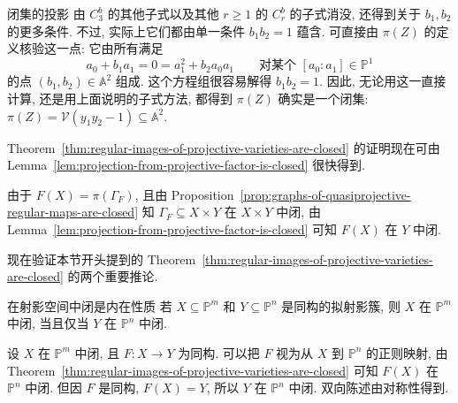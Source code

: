 \begin{Example}{闭集的投影}
由 $C_{3}^{b}$ 的其他子式以及其他 $r\ge1$ 的 $C_{r}^{b}$ 的子式消没, 还得到关于 $b_{1},b_{2}$ 的更多条件. 不过, 实际上它们都由单一条件 $b_{1}b_{2}=1$ 蕴含. 可直接由 $\pi(Z)$ 的定义核验这一点: 它由所有满足
\[
  a_{0}+b_{1}a_{1}=0=a_{1}^{2}+b_{2}a_{0}a_{1}
  \qquad\text{对某个 }[a_{0}:a_{1}]\in\mathbb{P}^{1}
\]
的点 $(b_{1},b_{2})\in\mathbb{A}^{2}$ 组成. 这个方程组很容易解得 $b_{1}b_{2}=1$. 因此, 无论用这一直接计算, 还是用上面说明的子式方法, 都得到 $\pi(Z)$ 确实是一个闭集: $\pi(Z)=\mathcal{V}(y_{1}y_{2}-1)\subseteq\mathbb{A}^{2}$.
\end{Example}

Theorem~\ref{thm:regular-images-of-projective-varieties-are-closed} 的证明现在可由 Lemma~\ref{lem:projection-from-projective-factor-is-closed} 很快得到.
\begingroup
\renewcommand{\AJProofBegin}{%
  \par\addvspace{\topsep}\noindent
  {\sffamily\bfseries\CJKfamily{pffont}Proof of Theorem~\ref{thm:regular-images-of-projective-varieties-are-closed}}\enspace\ignorespaces
}
\begin{Proof}
由于 $F(X)=\pi(\Gamma_{F})$, 且由 Proposition~\ref{prop:graphs-of-quasiprojective-regular-maps-are-closed} 知 $\Gamma_{F}\subseteq X\times Y$ 在 $X\times Y$ 中闭, 由 Lemma~\ref{lem:projection-from-projective-factor-is-closed} 可知 $F(X)$ 在 $Y$ 中闭.
\end{Proof}
\endgroup

现在验证本节开头提到的 Theorem~\ref{thm:regular-images-of-projective-varieties-are-closed} 的两个重要推论.

\begin{Corollary}{在射影空间中闭是内在性质}\leavevmode\label{cor:projectivity-invariant-under-quasiprojective-isomorphism}
若 $X\subseteq\mathbb{P}^{m}$ 和 $Y\subseteq\mathbb{P}^{n}$ 是同构的拟射影簇, 则 $X$ 在 $\mathbb{P}^{m}$ 中闭, 当且仅当 $Y$ 在 $\mathbb{P}^{n}$ 中闭.
\end{Corollary}
\begin{Proof}
设 $X$ 在 $\mathbb{P}^{m}$ 中闭, 且 $F:X\to Y$ 为同构. 可以把 $F$ 视为从 $X$ 到 $\mathbb{P}^{n}$ 的正则映射, 由 Theorem~\ref{thm:regular-images-of-projective-varieties-are-closed} 可知 $F(X)$ 在 $\mathbb{P}^{n}$ 中闭. 但因 $F$ 是同构, $F(X)=Y$, 所以 $Y$ 在 $\mathbb{P}^{n}$ 中闭. 双向陈述由对称性得到.
\end{Proof}

